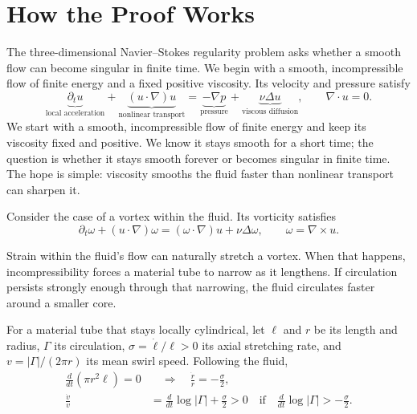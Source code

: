 \begingroup
\setlength{\parindent}{0pt}
\setlength{\parskip}{0.40\baselineskip}
\setlength{\abovedisplayskip}{6.5pt plus 1.5pt minus 1.5pt}
\setlength{\belowdisplayskip}{6.5pt plus 1.5pt minus 1.5pt}
\setlength{\jot}{5pt}

\section*{How the Proof Works}

The three-dimensional Navier--Stokes regularity problem asks whether a smooth
flow can become singular in finite time. We begin with a smooth,
incompressible flow of finite energy and a fixed positive viscosity. Its
velocity and pressure satisfy
\[
 \underbrace{\partial_tu}_{\text{local acceleration}}
 +\underbrace{(u\!\cdot\nabla)u}_{\text{nonlinear transport}}
 =\underbrace{-\nabla p}_{\text{pressure}}
 +\underbrace{\nu\Delta u}_{\text{viscous diffusion}},
 \qquad \nabla\!\cdot u=0.
\]
We start with a smooth, incompressible flow of finite energy and keep its
viscosity fixed and positive. We know it stays smooth for a short time; the
question is whether it stays smooth forever or becomes singular in finite
time. The hope is simple: viscosity smooths the fluid faster than nonlinear
transport can sharpen it.

Consider the case of a vortex within the fluid. Its vorticity satisfies
\[
 \partial_t\omega+(u\cdot\nabla)\omega
 =(\omega\cdot\nabla)u+\nu\Delta\omega,
 \qquad \omega=\nabla\times u.
\]

Strain within the fluid's flow can naturally stretch a vortex. When that
happens, incompressibility forces a material tube to narrow as it lengthens.
If circulation persists strongly enough through that narrowing, the fluid
circulates faster around a smaller core.

For a material tube that stays locally cylindrical, let \(\ell\) and \(r\)
be its length and radius, \(\Gamma\) its circulation,
\(\sigma=\dot\ell/\ell>0\) its axial stretching rate, and
\(v=|\Gamma|/(2\pi r)\) its mean swirl speed. Following the fluid,
\[
 \begin{aligned}
 \frac{d}{dt}(\pi r^2\ell)=0
 &\quad\Longrightarrow\quad \frac{\dot r}{r}=-\frac{\sigma}{2},\\
 \frac{\dot v}{v}
 &=\frac{d}{dt}\log|\Gamma|+\frac{\sigma}{2}>0
 \quad\text{if}\quad \frac{d}{dt}\log|\Gamma|>-\frac{\sigma}{2}.
 \end{aligned}
\]

